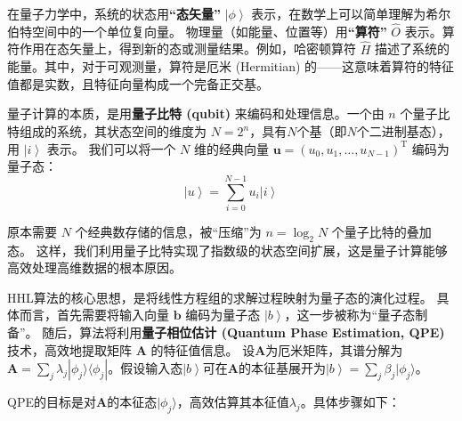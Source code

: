 \documentclass[12pt, a4paper]{article}
\newcommand{\ivec}[1]{\bm{#1}}                  %
\newcommand{\scalarfield}{u}                    %
\newcommand{\ket}[1]{\left| #1 \right\rangle}   %
\newcommand{\mat}[1]{\mathbf{#1}}               %
\newcommand{\transpose}[1]{{#1}^{\mathrm{T}}}   %
\begin{document}
在量子力学中，系统的状态用\textbf{“态矢量”} $\ket{\phi}$ 表示，在数学上可以简单理解为希尔伯特空间中的一个单位复向量。
物理量（如能量、位置等）用\textbf{“算符”} $\hat{O}$ 表示。算符作用在态矢量上，得到新的态或测量结果。例如，哈密顿算符 $\hat{H}$ 描述了系统的能量。其中，对于可观测量，算符是厄米 (Hermitian) 的——这意味着算符的特征值都是实数，且特征向量构成一个完备正交基。

量子计算的本质，是用\textbf{量子比特 (qubit)} 来编码和处理信息。一个由 $n$ 个量子比特组成的系统，其状态空间的维度为 $N=2^n$，具有$N$个基（即$N$个二进制基态），用 $\ket{i}$ 表示。
我们可以将一个 $N$ 维的经典向量 $\ivec{\scalarfield} = \transpose{(u_0, u_1, \ldots, u_{N-1})}$ 编码为量子态：
\begin{equation*}
    \ket{\scalarfield} = \sum_{i=0}^{N-1} u_i \ket{i}
\end{equation*}

原本需要 $N$ 个经典数存储的信息，被“压缩”为 $n = \log_2 N$ 个量子比特的叠加态。
这样，我们利用量子比特实现了指数级的状态空间扩展，这是量子计算能够高效处理高维数据的根本原因。

HHL算法的核心思想，是将线性方程组的求解过程映射为量子态的演化过程。
具体而言，首先需要将输入向量 $\ivec{b}$ 编码为量子态 $\ket{b}$，这一步被称为“量子态制备”。
随后，算法将利用\textbf{量子相位估计 (Quantum Phase Estimation, QPE)} 技术，高效地提取矩阵 $\mat{A}$ 的特征值信息。
设$\mat{A}$为厄米矩阵，其谱分解为$\mat{A} = \sum_j \lambda_j |\phi_j\rangle\langle\phi_j|$。假设输入态$\ket{b}$可在$\mat{A}$的本征基展开为$\ket{b} = \sum_j \beta_j |\phi_j\rangle$。

QPE的目标是对$\mat{A}$的本征态$|\phi_j\rangle$，高效估算其本征值$\lambda_j$。具体步骤如下：
\end{document}
